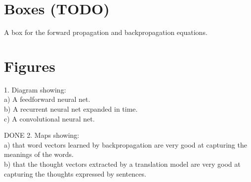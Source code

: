 \documentclass[]{article}
\begin{document}








\newpage

\iffalse
\section{Boxes (TODO)}

A box for the forward propagation and backpropagation equations.

\section{Figures}

1. Diagram showing:\\ a) A feedforward neural net.\\ b) A recurrent neural
net expanded in time.\\ c) A convolutional neural net.

DONE 2. Maps showing:\\ a) that word vectors learned by backpropagation are very
good at capturing the meanings of the words.\\ b) that the thought vectors
extracted by a translation model are very good at capturing the thoughts
expressed by sentences.
\end{document}
